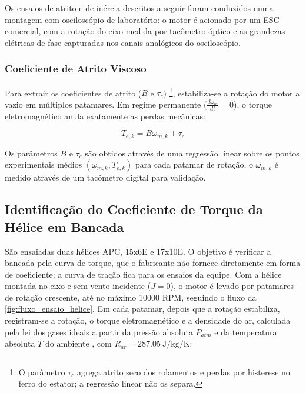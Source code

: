 Os ensaios de atrito e de inércia descritos a seguir foram conduzidos numa
montagem com osciloscópio de laboratório: o motor é acionado por um ESC
comercial, com a rotação do eixo medida por tacômetro óptico e as grandezas
elétricas de fase capturadas nos canais analógicos do osciloscópio.

\subsubsection{Coeficiente de Atrito Viscoso}
\label{sec:atrito_viscoso}

Para extrair os coeficientes de atrito ($B$ e $\tau_c$) \footnote{O parâmetro $\tau_c$ agrega atrito seco dos rolamentos e perdas por histerese no ferro do estator; a regressão linear não os separa.}, estabiliza-se a rotação do motor a vazio em múltiplos patamares. Em regime permanente ($\frac{d\omega_m}{dt} = 0$), o torque eletromagnético anula exatamente as perdas mecânicas:

\begin{equation}
    T_{e,k}= B\omega_{m,k} + \tau_c
    \label{eq:ensaio_vazio_iq}
\end{equation}

Os parâmetros $B$ e $\tau_c$ são obtidos através de uma regressão linear sobre os pontos experimentais médios $(\omega_{m,k}, T_{e,k})$ para cada patamar de rotação, o $\omega_{m,k}$ é medido através de um tacômetro digital para validação.

\subsection{Identificação do Coeficiente de Torque da Hélice em Bancada}
\label{sec:coef_aero_bancada}

São ensaiadas duas hélices APC, 15x6E e 17x10E. O objetivo é verificar a
bancada pela curva de torque, que o fabricante não fornece diretamente em forma
de coeficiente; a curva de tração fica para os ensaios da equipe. Com a hélice
montada no eixo e sem vento incidente ($J = 0$), o motor é levado por patamares
de rotação crescente, até no máximo \num{10000} RPM, seguindo o fluxo da
\autoref{fig:fluxo_ensaio_helice}. Em cada patamar, depois que a rotação
estabiliza, registram-se a rotação, o torque eletromagnético e a
densidade do ar, calculada pela lei dos gases ideais a partir da pressão
absoluta $P_{atm}$ e da temperatura absoluta $T$ do ambiente
\cite{Moran2018}, com $R_{ar} = \SI{287,05}{\joule\per\kilo\gram\per\kelvin}$:

